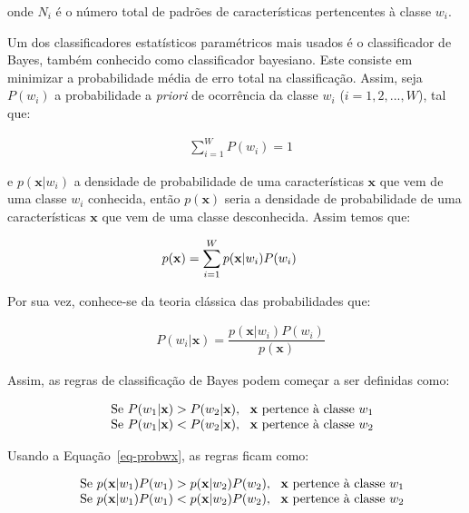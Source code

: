 onde $N_i$ é o número total de padrões de características pertencentes
à classe $w_i$.

Um dos classificadores estatísticos paramétricos mais usados é o
classificador de Bayes, também conhecido como classificador
bayesiano. Este consiste em minimizar a probabilidade média de erro
total na classificação.\cite{88} Assim, seja $P(w_i)$ a probabilidade
a \textit{priori} de ocorrência da classe $w_i$ ($i=1,2,...,W$), tal
que:

\begin{align}
 &\sum\limits_{i=1}^{W}P(w_i)=1
\end{align}

e $p(\textbf{x}|w_i)$ a densidade de probabilidade de uma
características $\textbf{x}$ que vem de uma classe $w_i$ conhecida,
então $p(\textbf{x})$ seria a densidade de probabilidade de uma
características $\textbf{x}$ que vem de uma classe desconhecida. Assim
temos que:

\begin{align}\label{eq-densprobx}
 &p(\textbf{\textbf{x}})=\sum\limits_{i=1}^{W}p(\textbf{\textbf{x}}|w_i)P(w_i)
\end{align}

Por sua vez, conhece-se da teoria clássica das probabilidades que:

\begin{align}\label{eq-probwx}
 &P(w_{i}|\textbf{x})=\dfrac{p(\textbf{x}|w_i)P(w_{i})}{p(\textbf{x})}
\end{align}

Assim, as regras de classificação de Bayes podem começar a ser
definidas como:

\begin{align}\label{eq-bayesreglas1}
 \begin{array}{c c}
  &\text{Se } P(w_{1}|\textbf{x})>P(w_{2}|\textbf{x}), \:\:\: \text{\textbf{x} pertence à classe $w_1$}\\
  &\text{Se } P(w_{1}|\textbf{x})<P(w_{2}|\textbf{x}),\:\:\: \text{\textbf{x} pertence à classe $w_2$}
 \end{array}
\end{align}

Usando a Equação~\ref{eq-probwx}, as regras ficam como:

\begin{align}\label{eq-bayesreglas2}
  \begin{array}{c c}
    &\text{Se } p(\textbf{x}|w_{1})P(w_1)>p(\textbf{x}|w_{2})P(w_2), \:\:\: \text{\textbf{x} pertence à classe $w_1$}\\
    &\text{Se } p(\textbf{x}|w_{1})P(w_1)<p(\textbf{x}|w_{2})P(w_2),\:\:\: \text{\textbf{x} pertence à classe $w_2$}
 \end{array}
\end{align}

